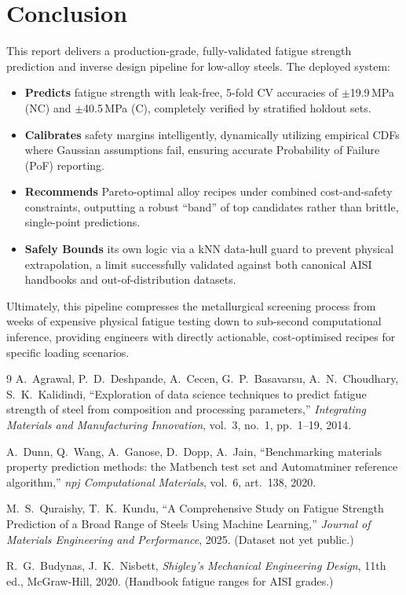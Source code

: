 \documentclass[10pt,a4paper]{article} %
\begin{document}
\section{Conclusion}

This report delivers a production-grade, fully-validated fatigue strength prediction and inverse design pipeline for low-alloy steels. The deployed system:

\begin{itemize}
  \item \textbf{Predicts} fatigue strength with leak-free, 5-fold CV accuracies of $\pm$19.9\,MPa (NC) and $\pm$40.5\,MPa (C), completely verified by stratified holdout sets.
  \item \textbf{Calibrates} safety margins intelligently, dynamically utilizing empirical CDFs where Gaussian assumptions fail, ensuring accurate Probability of Failure (PoF) reporting.
  \item \textbf{Recommends} Pareto-optimal alloy recipes under combined cost-and-safety constraints, outputting a robust ``band'' of top candidates rather than brittle, single-point predictions.
  \item \textbf{Safely Bounds} its own logic via a kNN data-hull guard to prevent physical extrapolation, a limit successfully validated against both canonical AISI handbooks and out-of-distribution datasets.
\end{itemize}

Ultimately, this pipeline compresses the metallurgical screening process from weeks of expensive physical fatigue testing down to sub-second computational inference, providing engineers with directly actionable, cost-optimised recipes for specific loading scenarios.
\begin{thebibliography}{9}
  A.~Agrawal, P.~D.~Deshpande, A.~Cecen, G.~P.~Basavarsu, A.~N.~Choudhary, S.~K.~Kalidindi,
  ``Exploration of data science techniques to predict fatigue strength of steel from composition
  and processing parameters,''
  \textit{Integrating Materials and Manufacturing Innovation}, vol.~3, no.~1, pp.~1--19, 2014.

  A.~Dunn, Q.~Wang, A.~Ganose, D.~Dopp, A.~Jain, ``Benchmarking materials property prediction
  methods: the Matbench test set and Automatminer reference algorithm,''
  \textit{npj Computational Materials}, vol.~6, art.~138, 2020.

  M.~S.~Quraishy, T.~K.~Kundu, ``A Comprehensive Study on Fatigue Strength Prediction of a
  Broad Range of Steels Using Machine Learning,''
  \textit{Journal of Materials Engineering and Performance}, 2025. (Dataset not yet public.)

  R.~G.~Budynas, J.~K.~Nisbett, \textit{Shigley's Mechanical Engineering Design}, 11th ed.,
  McGraw-Hill, 2020. (Handbook fatigue ranges for AISI grades.)
\end{thebibliography}
\end{document}

